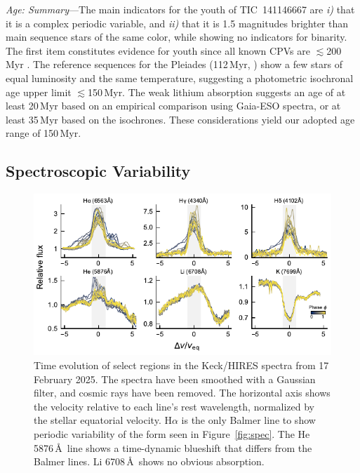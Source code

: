 \documentclass{nature3}
\begin{document}
\begin{methods}
{\it Age: Summary}---The main indicators for the youth of
TIC~141146667 are {\it i)} that it is a complex periodic variable, and
{\it ii)} that it is 1.5 magnitudes brighter than main sequence stars
of the same color, while showing no indicators for binarity.  The
first item constitutes evidence for youth since all known CPVs are
$\lesssim$200\,Myr \cite{Bouma2024}.  The reference sequences for the
Pleiades (112\,Myr, \cite{Dahm2015}) show a few stars of equal
luminosity and the same temperature, suggesting a photometric
isochronal age upper limit $\lesssim$150\,Myr.  The weak lithium
absorption suggests an age of at least 20\,Myr based on an empirical
comparison using Gaia-ESO spectra, or at least 35\,Myr based on the
\cite{Feiden2016} isochrones.  These considerations yield our adopted
age range of 150\,Myr.




\subsection{Spectroscopic Variability}\phantom{+}
\label{subsec:specvar}

\begin{figure}[!t]
  \centering
  \includegraphics[width=\textwidth]{figures/sf5.pdf}
  \caption{Time evolution of select regions in the Keck/HIRES
  spectra from 17 February 2025.
  The spectra have been smoothed with a Gaussian filter, and cosmic
  rays have been removed.
  The horizontal axis shows the velocity relative to each
  line's rest wavelength, normalized by the stellar equatorial
  velocity.  
  H$\alpha$ is the only Balmer line to show periodic variability of
  the form seen in Figure~\ref{fig:spec}.
  The He 5876\,\AA\ line shows a time-dynamic blueshift that 
  differs from the Balmer lines.
  Li 6708\,\AA\ shows no obvious absorption.
  }
  \label{fig:hirescuts}
\end{figure}


\end{methods}
\end{document}
